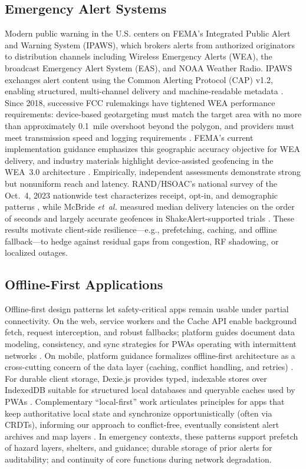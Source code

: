 \documentclass[11pt,twocolumn]{article}
\begin{document}
\subsection{Emergency Alert Systems}
Modern public warning in the U.S. centers on FEMA’s Integrated Public Alert and Warning System (IPAWS), which brokers alerts from authorized originators to distribution channels including Wireless Emergency Alerts (WEA), the broadcast Emergency Alert System (EAS), and NOAA Weather Radio. IPAWS exchanges alert content using the Common Alerting Protocol (CAP) v1.2, enabling structured, multi-channel delivery and machine-readable metadata \cite{fema-ipaws-2025,oasis-cap-1.2}. Since 2018, successive FCC rulemakings have tightened WEA performance requirements: device-based geo\-targeting must match the target area with no more than approximately 0.1~mile overshoot beyond the polygon, and providers must meet transmission speed and logging requirements \cite{fcc-2018-geo,fcc-wea-2023-doc}. FEMA’s current implementation guidance emphasizes this geographic accuracy objective for WEA delivery, and industry materials highlight device-assisted geofencing in the WEA~3.0 architecture \cite{fema-wea-geo-2023,atis-0700041-summary}. Empirically, independent assessments demonstrate strong but nonuniform reach and latency. RAND/HSOAC’s national survey of the Oct.\ 4, 2023 nationwide test characterizes receipt, opt-in, and demographic patterns \cite{rand-wea-2023-test}, while McBride \emph{et~al.} measured median delivery latencies on the order of seconds and largely accurate geofences in ShakeAlert-supported trials \cite{mcbride-2023-wea-latency}. These results motivate client-side resilience—e.g., prefetching, caching, and offline fallback—to hedge against residual gaps from congestion, RF shadowing, or localized outages.

\subsection{Offline-First Applications}
Offline-first design patterns let safety-critical apps remain usable under partial connectivity. On the web, service workers and the Cache API enable background fetch, request interception, and robust fallbacks; platform guides document data modeling, consistency, and sync strategies for PWAs operating with intermittent networks \cite{webdev-offline-data-2022,webdev-service-workers-2021,whatwg-sw-2025}. On mobile, platform guidance formalizes offline-first architecture as a cross-cutting concern of the data layer (caching, conflict handling, and retries) \cite{android-offline-first-2025}. For durable client storage, Dexie.js provides typed, indexable stores over IndexedDB suitable for structured local databases and queryable caches used by PWAs \cite{dexie-docs-home}. Complementary “local-first” work articulates principles for apps that keep authoritative local state and synchronize opportunistically (often via CRDTs), informing our approach to conflict-free, eventually consistent alert archives and map layers \cite{kleppmann-2019-localfirst}. In emergency contexts, these patterns support prefetch of hazard layers, shelters, and guidance; durable storage of prior alerts for auditability; and continuity of core functions during network degradation.
\end{document}
